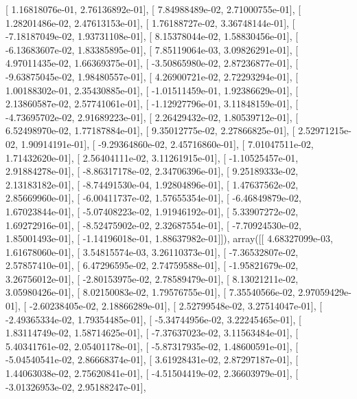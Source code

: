 \documentclass{article}
\begin{document}
       [  1.16818076e-01,   2.76136892e-01],
       [  7.84988489e-02,   2.71000755e-01],
       [  1.28201486e-02,   2.47613153e-01],
       [  1.76188727e-02,   3.36748144e-01],
       [ -7.18187049e-02,   1.93731108e-01],
       [  8.15378044e-02,   1.58830456e-01],
       [ -6.13683607e-02,   1.83385895e-01],
       [  7.85119064e-03,   3.09826291e-01],
       [  4.97011435e-02,   1.66369375e-01],
       [ -3.50865980e-02,   2.87236877e-01],
       [ -9.63875045e-02,   1.98480557e-01],
       [  4.26900721e-02,   2.72293294e-01],
       [  1.00188302e-01,   2.35430885e-01],
       [ -1.01511459e-01,   1.92386629e-01],
       [  2.13860587e-02,   2.57741061e-01],
       [ -1.12927796e-01,   3.11848159e-01],
       [ -4.73695702e-02,   2.91689223e-01],
       [  2.26429432e-02,   1.80539712e-01],
       [  6.52498970e-02,   1.77187884e-01],
       [  9.35012775e-02,   2.27866825e-01],
       [  2.52971215e-02,   1.90914191e-01],
       [ -9.29364860e-02,   2.45716860e-01],
       [  7.01047511e-02,   1.71432620e-01],
       [  2.56404111e-02,   3.11261915e-01],
       [ -1.10525457e-01,   2.91884278e-01],
       [ -8.86317178e-02,   2.34706396e-01],
       [  9.25189333e-02,   2.13183182e-01],
       [ -8.74491530e-04,   1.92804896e-01],
       [  1.47637562e-02,   2.85669960e-01],
       [ -6.00411737e-02,   1.57655354e-01],
       [ -6.46849879e-02,   1.67023844e-01],
       [ -5.07408223e-02,   1.91946192e-01],
       [  5.33907272e-02,   1.69272916e-01],
       [ -8.52475902e-02,   2.32687554e-01],
       [ -7.70924530e-02,   1.85001493e-01],
       [ -1.14196018e-01,   1.88637982e-01]]), array([[  4.68327099e-03,   1.61678060e-01],
       [  3.54815574e-03,   3.26110373e-01],
       [ -7.36532807e-02,   2.57857410e-01],
       [  6.47296595e-02,   2.74759588e-01],
       [ -1.95821679e-02,   3.26756012e-01],
       [ -2.80153975e-02,   2.78589479e-01],
       [  8.13021211e-02,   3.05980426e-01],
       [  8.02150083e-02,   1.79576755e-01],
       [  7.35540566e-02,   2.97059429e-01],
       [ -2.60238405e-02,   2.18866289e-01],
       [  2.52799548e-02,   3.27514047e-01],
       [ -2.49365334e-02,   1.79354485e-01],
       [ -5.34744956e-02,   3.22245465e-01],
       [  1.83114749e-02,   1.58714625e-01],
       [ -7.37637023e-02,   3.11563484e-01],
       [  5.40341761e-02,   2.05401178e-01],
       [ -5.87317935e-02,   1.48600591e-01],
       [ -5.04540541e-02,   2.86668374e-01],
       [  3.61928431e-02,   2.87297187e-01],
       [  1.44063038e-02,   2.75620841e-01],
       [ -4.51504419e-02,   2.36603979e-01],
       [ -3.01326953e-02,   2.95188247e-01],
\end{document}
